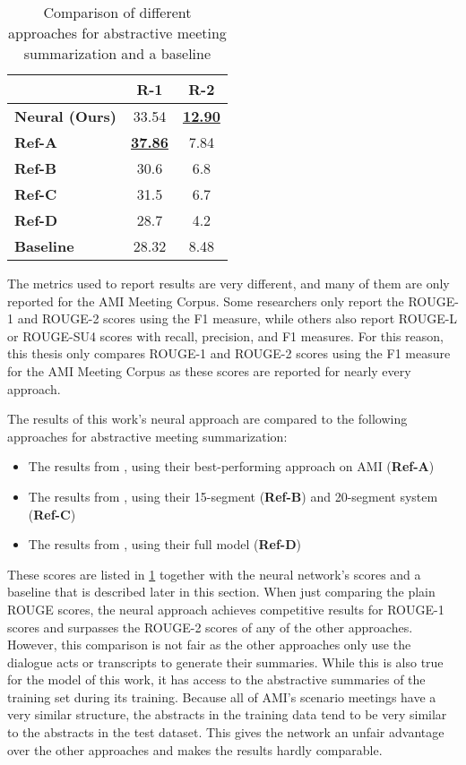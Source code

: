 \begin{table}[]
\centering
\begin{tabular}{@{}lcc@{}}
\toprule
                       & \textbf{R-1}     & \textbf{R-2}     \\ \midrule
\textbf{Neural (Ours)} & 33.54                & \underline{\textbf{12.90}} \\
\textbf{Ref-A}         & \underline{\textbf{37.86}} & 7.84                 \\
\textbf{Ref-B}         & 30.6                 & 6.8                  \\
\textbf{Ref-C}         & 31.5                 & 6.7                  \\
\textbf{Ref-D}         & 28.7                 & 4.2                  \\
\textbf{Baseline}      & 28.32                & 8.48                 \\ \bottomrule
\end{tabular}
\caption{Comparison of different approaches for abstractive meeting summarization and a baseline}
\label{tab:comparison}
\end{table}

The metrics used to report results are very different, and many of them are only reported for the AMI Meeting Corpus.
Some researchers only report the ROUGE-1 and ROUGE-2 scores using the F1 measure, while others also report ROUGE-L or ROUGE-SU4 scores with recall, precision, and F1 measures.
For this reason, this thesis only compares ROUGE-1 and ROUGE-2 scores using the F1 measure for the AMI Meeting Corpus as these scores are reported for nearly every approach.

The results of this work's neural approach are compared to the following approaches for abstractive meeting summarization:
\begin{itemize}
\item The results from \cite{shang-etal-2018-unsupervised}, using their best-performing approach on AMI (\textbf{Ref-A})
\item The results from \cite{oya-etal-2014-template}, using their 15-segment (\textbf{Ref-B}) and 20-segment system (\textbf{Ref-C})
\item The results from \cite{mehdad-etal-2013-abstractive}, using their full model (\textbf{Ref-D})
\end{itemize}

These scores are listed in \cref{tab:comparison} together with the neural network's scores and a baseline that is described later in this section.
When just comparing the plain ROUGE scores, the neural approach achieves competitive results for ROUGE-1 scores and surpasses the ROUGE-2 scores of any of the other approaches.
However, this comparison is not fair as the other approaches only use the dialogue acts or transcripts to generate their summaries.
While this is also true for the model of this work, it has access to the abstractive summaries of the training set during its training.
Because all of AMI's scenario meetings have a very similar structure, the abstracts in the training data tend to be very similar to the abstracts in the test dataset.
This gives the network an unfair advantage over the other approaches and makes the results hardly comparable.

